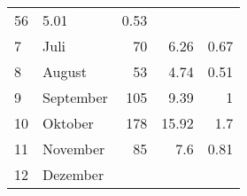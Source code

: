 \begin{longtable}{lXrrr}
       \num{56} &
       \num[round-mode=places,round-precision=2]{5,01} &
         \num[round-mode=places,round-precision=2]{0,53} \\

     7 &
     \multicolumn{1}{X}{ Juli   } &


       \num{70} &
       \num[round-mode=places,round-precision=2]{6,26} &
         \num[round-mode=places,round-precision=2]{0,67} \\

     8 &
     \multicolumn{1}{X}{ August   } &


       \num{53} &
       \num[round-mode=places,round-precision=2]{4,74} &
         \num[round-mode=places,round-precision=2]{0,51} \\

     9 &
     \multicolumn{1}{X}{ September   } &


       \num{105} &
       \num[round-mode=places,round-precision=2]{9,39} &
         \num[round-mode=places,round-precision=2]{1} \\

     10 &
     \multicolumn{1}{X}{ Oktober   } &


       \num{178} &
       \num[round-mode=places,round-precision=2]{15,92} &
         \num[round-mode=places,round-precision=2]{1,7} \\

     11 &
     \multicolumn{1}{X}{ November   } &


       \num{85} &
       \num[round-mode=places,round-precision=2]{7,6} &
         \num[round-mode=places,round-precision=2]{0,81} \\

     12 &
     \multicolumn{1}{X}{ Dezember   } &



\end{longtable}
